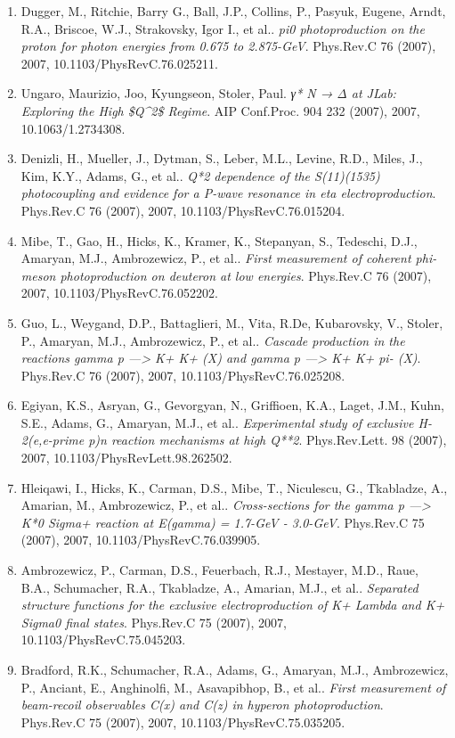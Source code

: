 \begin{enumerate}
\item Dugger, M., Ritchie, Barry G., Ball, J.P., Collins, P., Pasyuk, Eugene, Arndt, R.A., Briscoe, W.J., Strakovsky, Igor I., et al.. \textit{pi0 photoproduction on the proton for photon energies from 0.675 to 2.875-GeV}. Phys.Rev.C 76 (2007), 2007, 10.1103/PhysRevC.76.025211.
\item Ungaro, Maurizio, Joo, Kyungseon, Stoler, Paul. \textit{γ* N → Δ at JLab: Exploring the High \$Q\textasciicircum{}2\$ Regime}. AIP Conf.Proc. 904 232 (2007), 2007, 10.1063/1.2734308.
\item Denizli, H., Mueller, J., Dytman, S., Leber, M.L., Levine, R.D., Miles, J., Kim, K.Y., Adams, G., et al.. \textit{Q*2 dependence of the S(11)(1535) photocoupling and evidence for a P-wave resonance in eta electroproduction}. Phys.Rev.C 76 (2007), 2007, 10.1103/PhysRevC.76.015204.
\item Mibe, T., Gao, H., Hicks, K., Kramer, K., Stepanyan, S., Tedeschi, D.J., Amaryan, M.J., Ambrozewicz, P., et al.. \textit{First measurement of coherent phi-meson photoproduction on deuteron at low energies}. Phys.Rev.C 76 (2007), 2007, 10.1103/PhysRevC.76.052202.
\item Guo, L., Weygand, D.P., Battaglieri, M., Vita, R.De, Kubarovsky, V., Stoler, P., Amaryan, M.J., Ambrozewicz, P., et al.. \textit{Cascade production in the reactions gamma p ---> K+ K+ (X) and gamma p ---> K+ K+ pi- (X)}. Phys.Rev.C 76 (2007), 2007, 10.1103/PhysRevC.76.025208.
\item Egiyan, K.S., Asryan, G., Gevorgyan, N., Griffioen, K.A., Laget, J.M., Kuhn, S.E., Adams, G., Amaryan, M.J., et al.. \textit{Experimental study of exclusive H-2(e,e-prime p)n reaction mechanisms at high Q**2}. Phys.Rev.Lett. 98 (2007), 2007, 10.1103/PhysRevLett.98.262502.
\item Hleiqawi, I., Hicks, K., Carman, D.S., Mibe, T., Niculescu, G., Tkabladze, A., Amarian, M., Ambrozewicz, P., et al.. \textit{Cross-sections for the gamma p ---> K*0 Sigma+ reaction at E(gamma) = 1.7-GeV - 3.0-GeV}. Phys.Rev.C 75 (2007), 2007, 10.1103/PhysRevC.76.039905.
\item Ambrozewicz, P., Carman, D.S., Feuerbach, R.J., Mestayer, M.D., Raue, B.A., Schumacher, R.A., Tkabladze, A., Amarian, M.J., et al.. \textit{Separated structure functions for the exclusive electroproduction of K+ Lambda and K+ Sigma0 final states}. Phys.Rev.C 75 (2007), 2007, 10.1103/PhysRevC.75.045203.
\item Bradford, R.K., Schumacher, R.A., Adams, G., Amaryan, M.J., Ambrozewicz, P., Anciant, E., Anghinolfi, M., Asavapibhop, B., et al.. \textit{First measurement of beam-recoil observables C(x) and C(z) in hyperon photoproduction}. Phys.Rev.C 75 (2007), 2007, 10.1103/PhysRevC.75.035205.

\end{enumerate}

